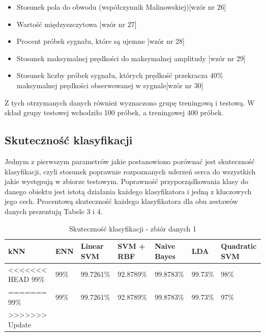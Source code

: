 \documentclass[[10pt,a4paper]{article}
\begin{document}
\begin{itemize}
	\item{Stosunek pola do obwodu (współczynnik Malinowskiej)[wzór nr 26]}
	
	\item{Wartość międzyszczytowa [wzór nr 27]}
	
	\item{Procent próbek sygnału, które są ujemne [wzór nr 28]}
	
	\item{Stosunek maksymalnej prędkości do maksymalnej amplitudy [wzór nr 29]}
	
	\item{Stosunek liczby próbek sygnału, których prędkość przekracza 40\% maksymalnej prędkości obserwowanej w sygnale[wzór nr 30]}
	
\end{itemize}

Z tych otrzymanych danych również wyznaczono grupę treningową i testową. W skład grupy testowej wchodziło  100 próbek, a treningowej 400 próbek.

\subsection{Skuteczność klasyfikacji}

Jednym z pierwszym parametrów jakie postanowiono porównać jest skuteczność klasyfikacji, czyli stosunek poprawnie rozpoznanych uderzeń serca do wszystkich jakie występują w zbiorze testowym. Poprawność przyporządkowania klasy do danego obiektu jest istotą działania każdego klasyfikatora i jedną z kluczowych jego cech. Procentową skuteczność każdego klasyfikatora  dla obu zestawów danych prezentują Tabele 3 i 4.

\begin{table}[h]
\centering
\caption{Skuteczność klasyfikacji - zbiór danych 1}
\label{accuracyTable2}
\begin{tabular}{|l|l|l|l|l|l|l|}
\hline
kNN & ENN & Linear SVM & SVM + RBF & Naive Bayes & LDA & Quadratic SVM \\ \hline
<<<<<<< HEAD
  99\%   &  99\%  & 99.7261\%       & 92.8789\%      & 99.8783\%        &   99.73\%  & 98\%\\ \hline
=======
  99\%   &  99\%  & 99.7261\%       & 92.8789\%      & 99.8783\%        &   99.73\%  & 97\%\\ \hline
>>>>>>> Update
\end{tabular}
\end{table}
\end{document}
